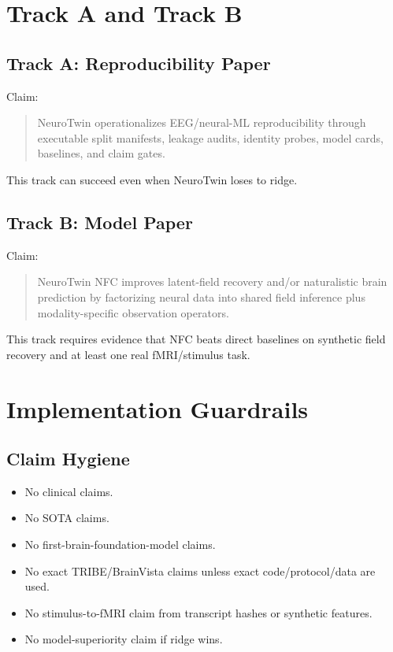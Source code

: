 \documentclass[11pt]{article}
\begin{document}
\section{Track A and Track B}

\subsection{Track A: Reproducibility Paper}
Claim:
\begin{quote}
NeuroTwin operationalizes EEG/neural-ML reproducibility through executable split manifests, leakage audits, identity probes, model cards, baselines, and claim gates.
\end{quote}
This track can succeed even when NeuroTwin loses to ridge.

\subsection{Track B: Model Paper}
Claim:
\begin{quote}
NeuroTwin NFC improves latent-field recovery and/or naturalistic brain prediction by factorizing neural data into shared field inference plus modality-specific observation operators.
\end{quote}
This track requires evidence that NFC beats direct baselines on synthetic field recovery and at least one real fMRI/stimulus task.

\section{Implementation Guardrails}

\subsection{Claim Hygiene}
\begin{itemize}
\item No clinical claims.
\item No SOTA claims.
\item No first-brain-foundation-model claims.
\item No exact TRIBE/BrainVista claims unless exact code/protocol/data are used.
\item No stimulus-to-fMRI claim from transcript hashes or synthetic features.
\item No model-superiority claim if ridge wins.
\end{itemize}
\end{document}
